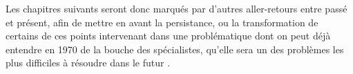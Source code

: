 Les chapitres suivants seront donc marqués par d'autres aller-retours entre passé et présent, afin de mettre en avant la persistance, ou la transformation de certains de ces points intervenant dans une problématique dont on peut déjà entendre en 1970 de la bouche des spécialistes, qu'elle sera un des problèmes les plus difficiles à résoudre dans le futur \autocites{Hermann1967, Naylor1967, Guetzkow1972, Doran1975}. 


